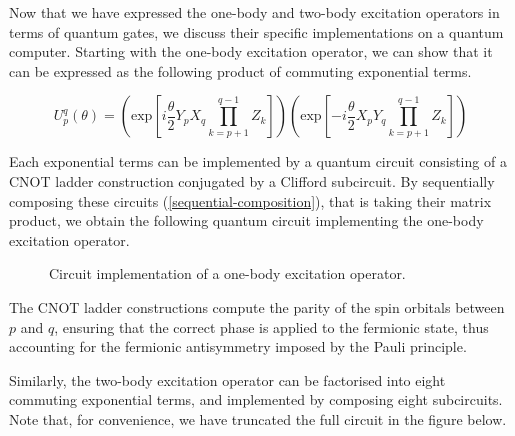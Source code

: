 Now that we have expressed the one-body and two-body excitation operators in terms of quantum gates, we discuss their specific implementations on a quantum computer. Starting with the one-body excitation operator, we can show that it can be expressed as the following product of commuting exponential terms.

\begin{equation*}
    U^q_p (\theta) =
    \left( \text{exp} \left[
    i \frac{\theta}{2} Y_p X_q \prod_{k=p+1}^{q-1} Z_k \right] \right)
    \left( \text{exp} \left[ -
    i \frac{\theta}{2} X_p Y_q \prod_{k=p+1}^{q-1} Z_k \right] \right)
\end{equation*}

Each exponential terms can be implemented by a quantum circuit consisting of a CNOT ladder construction conjugated by a Clifford subcircuit. By sequentially composing these circuits (\ref{sequential-composition}), that is taking their matrix product, we obtain the following quantum circuit implementing the one-body excitation operator.





\begin{figure}[H]
    \centering
    \caption{Circuit implementation of a one-body excitation operator.}
    \label{one-body-implementation}
\end{figure}

The CNOT ladder constructions compute the parity of the spin orbitals between $p$ and $q$, ensuring that the correct phase is applied to the fermionic state, thus accounting for the fermionic antisymmetry imposed by the Pauli principle.

Similarly, the two-body excitation operator can be factorised into eight commuting exponential terms, and implemented by composing eight subcircuits. Note that, for convenience, we have truncated the full circuit in the figure below.

